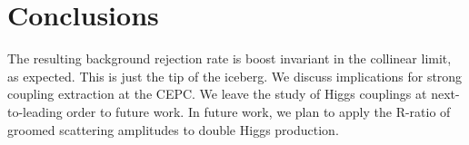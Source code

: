 \section{Conclusions}\label{sec:conclusions}

The resulting background rejection rate is boost invariant in the
collinear limit, as expected. This is just the tip of the iceberg. We
discuss implications for strong coupling extraction at the CEPC. We
leave the study of Higgs couplings at next-to-leading order to future
work. In future work, we plan to apply the R-ratio of groomed scattering
amplitudes to double Higgs production.

